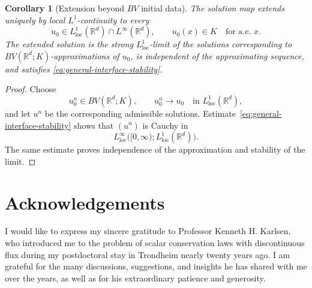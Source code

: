 \documentclass[11pt]{amsart}
\numberwithin{equation}{section}
\theoremstyle{plain}
\newtheorem{corollary}[theorem]{Corollary}
\theoremstyle{definition}
\theoremstyle{remark}
\begin{document}
\begin{corollary}[Extension beyond \(BV\) initial data]
\label{cor:general-extension-l1}
The solution map extends uniquely by local \(L^1\)-continuity to every
\[
    u_0
    \in
    L^1_{\mathrm{loc}}(\mathbb R^d)
    \cap
    L^\infty(\mathbb R^d),
    \qquad
    u_0(x)\in K
    \quad\text{for a.e. }x.
\]
The extended solution is the strong \(L^1_{\mathrm{loc}}\)-limit of the
solutions corresponding to \(BV(\mathbb R^d;K)\)-approximations of \(u_0\),
is independent of the approximating sequence, and satisfies
\eqref{eq:general-interface-stability}.
\end{corollary}

\begin{proof}
Choose
\[
    u_0^n\in BV(\mathbb R^d;K),
    \qquad
    u_0^n\longrightarrow u_0
    \quad\text{in }L^1_{\mathrm{loc}}(\mathbb R^d),
\]
and let \(u^n\) be the corresponding admissible solutions.
Estimate~\eqref{eq:general-interface-stability} shows that \((u^n)\) is
Cauchy in
\[
    L^\infty_{\mathrm{loc}}
    \bigl(
        [0,\infty);
        L^1_{\mathrm{loc}}(\mathbb R^d)
    \bigr).
\]
The same estimate proves independence of the approximation and stability of
the limit.
\end{proof}


    \section*{Acknowledgements}

I would like to express my sincere gratitude to Professor Kenneth H. Karlsen,
who introduced me to the problem of scalar conservation laws with
discontinuous flux during my postdoctoral stay in Trondheim nearly twenty
years ago. I am grateful for the many discussions, suggestions, and insights
he has shared with me over the years, as well as for his extraordinary
patience and generosity.
\end{document}
